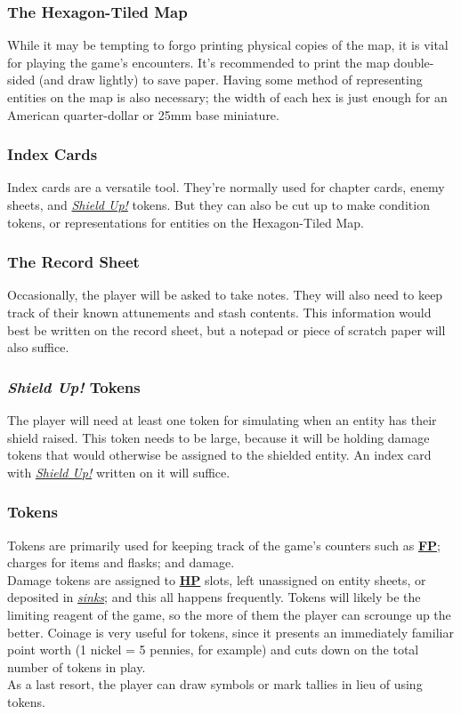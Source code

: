 \documentclass[12pt]{article}
\newcommand{\refto}[1]{\hyperlink{#1}{\textbf{#1}}}
\newcommand{\reftoit}[1]{\hyperlink{#1}{\emph{#1}}}
\begin{document}
\begin{multicols*}{2}
\subsubsection*{The Hexagon-Tiled Map}
While it may be tempting to forgo printing physical copies of the map, it is vital for playing the game’s encounters. It’s recommended to print the map double-sided (and draw lightly) to save paper. Having some method of representing entities on the map is also necessary; the width of each hex is just enough for an American quarter-dollar or 25mm base miniature.

\subsubsection*{Index Cards}
Index cards are a versatile tool. They’re normally used for chapter cards, enemy sheets, and \reftoit{Shield Up!} tokens. But they can also be cut up to make condition tokens, or representations for entities on the Hexagon-Tiled Map.

\subsubsection*{The Record Sheet}
Occasionally, the player will be asked to take notes. They will also need to keep track of their known attunements and stash contents. This information would best be written on the record sheet, but a notepad or piece of scratch paper will also suffice.

\subsubsection*{\emph{Shield Up!} Tokens}
The player will need at least one token for simulating when an entity has their shield raised. This token needs to be large, because it will be holding damage tokens that would otherwise be assigned to the shielded entity. An index card with \reftoit{Shield Up!} written on it will suffice.

\subsubsection*{Tokens}
Tokens are primarily used for keeping track of the game’s counters such as \refto{FP}; charges for items and flasks; and damage.\\
Damage tokens are assigned to \refto{HP} slots, left unassigned on entity sheets, or deposited in \reftoit{sinks}; and this all happens frequently. Tokens will likely be the limiting reagent of the game, so the more of them the player can scrounge up the better. Coinage is very useful for tokens, since it presents an immediately familiar point worth (1 nickel = 5 pennies, for example) and cuts down on the total number of tokens in play.\\
As a last resort, the player can draw symbols or mark tallies in lieu of using tokens.
\end{multicols*}
\end{document}
